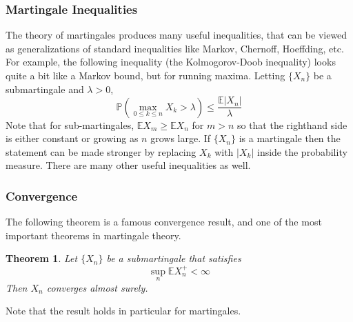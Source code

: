 \documentclass[12pt]{article}
\newcommand*{\abs}[1]{\left\lvert#1\right\rvert}
\newcommand{\E}{\mathbb{E}}
\newcommand{\Prob}{\mathbb{P}}
\newtheorem{thm}{Theorem}
\begin{document}
\subsubsection{Martingale Inequalities}
The theory of martingales produces many useful inequalities, that can be viewed as generalizations of standard inequalities like Markov, Chernoff, Hoeffding, etc. 
For example, the following inequality (the Kolmogorov-Doob inequality) looks quite a bit like a Markov bound, but for running maxima. Letting $\{X_n\}$ be a 
submartingale and $\lambda > 0$, 
\[\Prob(\max_{0 \leq k \leq n} X_k > \lambda) \leq \frac{\E \abs{X_n}}{\lambda}\]
Note that for sub-martingales, $\E X_m \geq \E X_n$ for $m > n$ so that the righthand side is either constant or growing as $n$ grows large. If $\{X_n\}$ is a
martingale then the statement can be made stronger by replacing $X_k$ with $\abs{X_k}$ inside the probability measure. There are many other useful inequalities as well. 

\subsubsection{Convergence}
The following theorem is a famous convergence result, and one of the most important theorems in martingale theory. 

\begin{thm}
Let $\{X_n\}$ be a submartingale that satisfies 
\[\sup_n \E X_n^+ < \infty\]
Then $X_n$ converges almost surely. 
\end{thm}
Note that the result holds in particular for martingales. 
\end{document}
